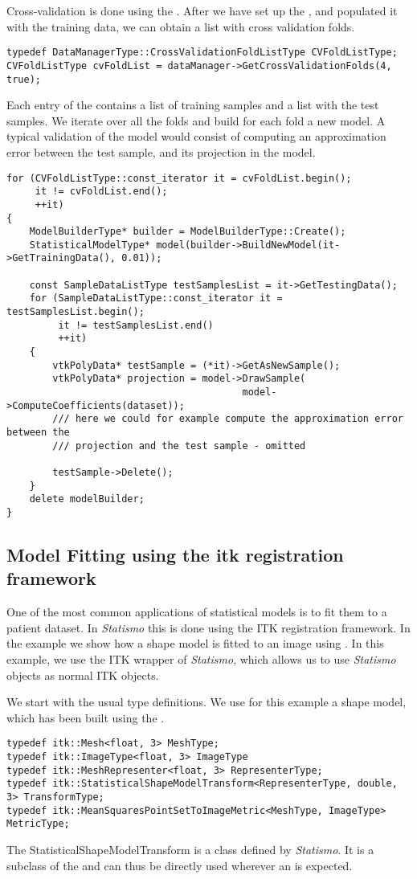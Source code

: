 \documentclass{InsightArticle}
\newcommand{\Statismo}{\emph{Statismo}\xspace}
\begin{document}
Cross-validation is done using the . 
After we have set up the , and populated it with the training data, we 
can obtain a list with cross validation folds. 
\begin{verbatim}
typedef DataManagerType::CrossValidationFoldListType CVFoldListType;
CVFoldListType cvFoldList = dataManager->GetCrossValidationFolds(4, true);
\end{verbatim}
Each entry of the  contains a list of training samples and a list with the test samples. 
We iterate over all the folds and build for each fold a new model. A typical validation of the model would 
consist of computing an approximation error between the test sample, and its projection in the model. 
\begin{verbatim}
for (CVFoldListType::const_iterator it = cvFoldList.begin();
     it != cvFoldList.end();
     ++it)
{
    ModelBuilderType* builder = ModelBuilderType::Create();
    StatisticalModelType* model(builder->BuildNewModel(it->GetTrainingData(), 0.01));

    const SampleDataListType testSamplesList = it->GetTestingData();
    for (SampleDataListType::const_iterator it = testSamplesList.begin();
         it != testSamplesList.end()
         ++it)
    {
        vtkPolyData* testSample = (*it)->GetAsNewSample();
        vtkPolyData* projection = model->DrawSample(
                                         model->ComputeCoefficients(dataset));
        /// here we could for example compute the approximation error between the 
        /// projection and the test sample - omitted

        testSample->Delete();
    }
    delete modelBuilder;
}

\end{verbatim}

\subsection{Model Fitting using the itk registration framework}\label{sec:model-fitting}
One of the most common applications of statistical models is to fit them to a patient dataset. 
In \Statismo this is done using the ITK registration framework. In the example 
we show how a shape model is fitted to an image using . 
In this example, we use the ITK wrapper of \Statismo, which allows us to use \Statismo objects as normal ITK objects.

We start with the usual type definitions. We use for this example a shape model, which has been 
built using the . 
\begin{verbatim}
typedef itk::Mesh<float, 3> MeshType;
typedef itk::ImageType<float, 3> ImageType
typedef itk::MeshRepresenter<float, 3> RepresenterType;
typedef itk::StatisticalShapeModelTransform<RepresenterType, double, 3> TransformType;
typedef itk::MeanSquaresPointSetToImageMetric<MeshType, ImageType> MetricType;
\end{verbatim}
The StatisticalShapeModelTransform is a class defined by \Statismo. It is a subclass of the 
and can thus be directly used wherever an  is expected. 
\end{document}

